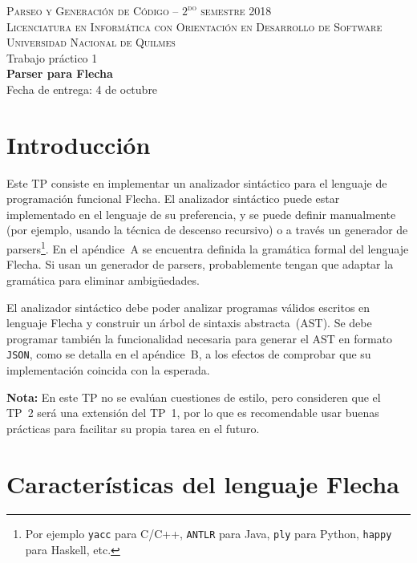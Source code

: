 \documentclass{article}
\newcommand{\flecha}{\textsf{Flecha}\xspace}
\begin{document}
\begin{center}
\textsc{{\small Parseo y Generaci\'on de C\'odigo -- $2^{\text{do}}$ semestre 2018}} \medskip \\ 
\textsc{{\small Licenciatura en Inform\'atica con Orientaci\'on en Desarrollo de Software}} \medskip \\
\textsc{{\small Universidad Nacional de Quilmes}} \medskip \\
{\Large Trabajo pr\'actico 1} \medskip \\
{\large {\bf Parser para \flecha}} \medskip \\
\bigskip
Fecha de entrega: 4 de octubre
\end{center}

\tableofcontents

\section{Introducci\'on}

Este TP consiste en implementar un analizador sintáctico
para el lenguaje de programación funcional \flecha.
El analizador sintáctico puede estar implementado en el lenguaje de su
preferencia, y se puede definir manualmente (por ejemplo, usando la técnica
de descenso recursivo) o a través un generador de parsers\footnote{Por ejemplo
\texttt{yacc} para C/C++, \texttt{ANTLR} para Java, \texttt{ply} para Python, \texttt{happy} para Haskell,
etc.}.
En el apéndice~A se encuentra definida la gramática formal del lenguaje \flecha.
Si usan un generador de parsers, probablemente tengan que adaptar la gramática
para eliminar ambigüedades.

El analizador sintáctico debe poder analizar programas válidos escritos en lenguaje
\flecha y construir un árbol de sintaxis abstracta~(AST).
Se debe programar también la funcionalidad necesaria para generar
el AST en formato \texttt{JSON}, como se detalla en el apéndice~B,
a los efectos de comprobar que su implementación coincida con la esperada.

{\bf Nota:} En este TP no se evalúan cuestiones de estilo,
pero consideren que el TP~2 será una extensión del TP~1,
por lo que es recomendable usar buenas prácticas para facilitar
su propia tarea en el futuro.

\section{Características del lenguaje \flecha}
\end{document}
